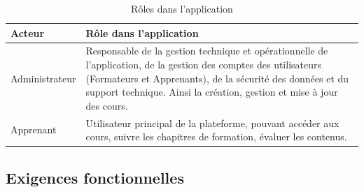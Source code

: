 \begin{table}[htbp]
    \centering
    \begin{tabular}{|m{5cm}|m{10cm}|}
        \hline
        \textbf{Acteur} & \textbf{Rôle dans l'application} \\
        \hline
        Administrateur & Responsable de la gestion technique et opérationnelle de l'application, de la gestion des comptes des utilisateurs (Formateurs et Apprenants), de la sécurité des données et du support technique. Ainsi la création, gestion et mise à jour des cours. \\
        \hline
        Apprenant & Utilisateur principal de la plateforme, pouvant accéder aux cours, suivre les chapitres de formation, évaluer les contenus. \\
        \hline
    \end{tabular}
    \caption{Rôles dans l'application}
    \label{tab:roles}
\end{table}

\subsection{Exigences fonctionnelles}


